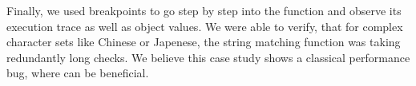 Finally, we used breakpoints to go step by step into the function and observe its execution trace as well as object values.
We were able to verify, that for complex character sets like Chinese or Japenese, the string matching function was taking redundantly long checks.
We believe this case study shows a classical performance bug, where \parikshan can be beneficial.



